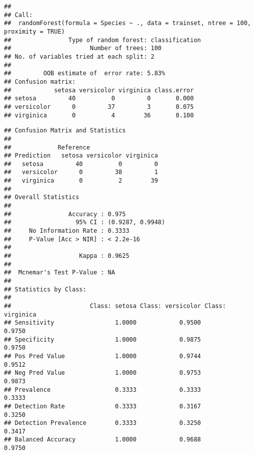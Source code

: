 \documentclass[
]{article}
\newenvironment{Shaded}{\begin{snugshade}}{\end{snugshade}}
\newcommand{\AttributeTok}[1]{\textcolor[rgb]{0.77,0.63,0.00}{#1}}
\newcommand{\CommentTok}[1]{\textcolor[rgb]{0.56,0.35,0.01}{\textit{#1}}}
\newcommand{\DecValTok}[1]{\textcolor[rgb]{0.00,0.00,0.81}{#1}}
\newcommand{\FunctionTok}[1]{\textcolor[rgb]{0.00,0.00,0.00}{#1}}
\newcommand{\NormalTok}[1]{#1}
\newcommand{\OtherTok}[1]{\textcolor[rgb]{0.56,0.35,0.01}{#1}}
\newcommand{\SpecialCharTok}[1]{\textcolor[rgb]{0.00,0.00,0.00}{#1}}
\newcommand{\StringTok}[1]{\textcolor[rgb]{0.31,0.60,0.02}{#1}}
\begin{document}
\begin{verbatim}
## 
## Call:
##  randomForest(formula = Species ~ ., data = trainset, ntree = 100,      proximity = TRUE) 
##                Type of random forest: classification
##                      Number of trees: 100
## No. of variables tried at each split: 2
## 
##         OOB estimate of  error rate: 5.83%
## Confusion matrix:
##            setosa versicolor virginica class.error
## setosa         40          0         0       0.000
## versicolor      0         37         3       0.075
## virginica       0          4        36       0.100
\end{verbatim}

\begin{Shaded}
\end{Shaded}

\begin{verbatim}
## Confusion Matrix and Statistics
## 
##             Reference
## Prediction   setosa versicolor virginica
##   setosa         40          0         0
##   versicolor      0         38         1
##   virginica       0          2        39
## 
## Overall Statistics
##                                           
##                Accuracy : 0.975           
##                  95% CI : (0.9287, 0.9948)
##     No Information Rate : 0.3333          
##     P-Value [Acc > NIR] : < 2.2e-16       
##                                           
##                   Kappa : 0.9625          
##                                           
##  Mcnemar's Test P-Value : NA              
## 
## Statistics by Class:
## 
##                      Class: setosa Class: versicolor Class: virginica
## Sensitivity                 1.0000            0.9500           0.9750
## Specificity                 1.0000            0.9875           0.9750
## Pos Pred Value              1.0000            0.9744           0.9512
## Neg Pred Value              1.0000            0.9753           0.9873
## Prevalence                  0.3333            0.3333           0.3333
## Detection Rate              0.3333            0.3167           0.3250
## Detection Prevalence        0.3333            0.3250           0.3417
## Balanced Accuracy           1.0000            0.9688           0.9750
\end{verbatim}

\begin{Shaded}
\end{Shaded}
\end{document}

